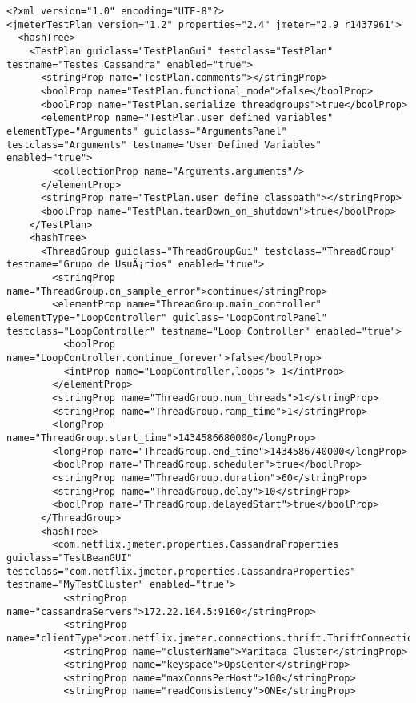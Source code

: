 \begin{lstlisting}[style=xml]
<?xml version="1.0" encoding="UTF-8"?>
<jmeterTestPlan version="1.2" properties="2.4" jmeter="2.9 r1437961">
  <hashTree>
    <TestPlan guiclass="TestPlanGui" testclass="TestPlan" testname="Testes Cassandra" enabled="true">
      <stringProp name="TestPlan.comments"></stringProp>
      <boolProp name="TestPlan.functional_mode">false</boolProp>
      <boolProp name="TestPlan.serialize_threadgroups">true</boolProp>
      <elementProp name="TestPlan.user_defined_variables" elementType="Arguments" guiclass="ArgumentsPanel" testclass="Arguments" testname="User Defined Variables" enabled="true">
        <collectionProp name="Arguments.arguments"/>
      </elementProp>
      <stringProp name="TestPlan.user_define_classpath"></stringProp>
      <boolProp name="TestPlan.tearDown_on_shutdown">true</boolProp>
    </TestPlan>
    <hashTree>
      <ThreadGroup guiclass="ThreadGroupGui" testclass="ThreadGroup" testname="Grupo de UsuÃ¡rios" enabled="true">
        <stringProp name="ThreadGroup.on_sample_error">continue</stringProp>
        <elementProp name="ThreadGroup.main_controller" elementType="LoopController" guiclass="LoopControlPanel" testclass="LoopController" testname="Loop Controller" enabled="true">
          <boolProp name="LoopController.continue_forever">false</boolProp>
          <intProp name="LoopController.loops">-1</intProp>
        </elementProp>
        <stringProp name="ThreadGroup.num_threads">1</stringProp>
        <stringProp name="ThreadGroup.ramp_time">1</stringProp>
        <longProp name="ThreadGroup.start_time">1434586680000</longProp>
        <longProp name="ThreadGroup.end_time">1434586740000</longProp>
        <boolProp name="ThreadGroup.scheduler">true</boolProp>
        <stringProp name="ThreadGroup.duration">60</stringProp>
        <stringProp name="ThreadGroup.delay">10</stringProp>
        <boolProp name="ThreadGroup.delayedStart">true</boolProp>
      </ThreadGroup>
      <hashTree>
        <com.netflix.jmeter.properties.CassandraProperties guiclass="TestBeanGUI" testclass="com.netflix.jmeter.properties.CassandraProperties" testname="MyTestCluster" enabled="true">
          <stringProp name="cassandraServers">172.22.164.5:9160</stringProp>
          <stringProp name="clientType">com.netflix.jmeter.connections.thrift.ThriftConnection</stringProp>
          <stringProp name="clusterName">Maritaca Cluster</stringProp>
          <stringProp name="keyspace">OpsCenter</stringProp>
          <stringProp name="maxConnsPerHost">100</stringProp>
          <stringProp name="readConsistency">ONE</stringProp>

\end{lstlisting}
